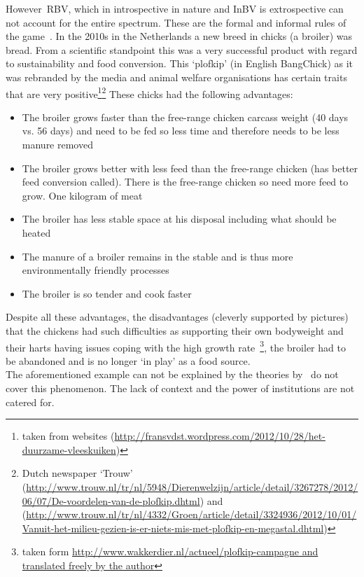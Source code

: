 However~\gls{RBV}, which in introspective in nature and \gls{InBV} is extrospective can not account for the entire spectrum. These are the formal and informal rules of the game~\cite{North:1990}. In the 2010s in the Netherlands a new breed in chicks (a broiler) was bread. From a scientific standpoint this was a very successful product with regard to sustainability and food conversion. 
This `plofkip' (in English BangChick) as it was rebranded by the media and animal welfare organisations has certain traits that are very positive\footnote{taken from websites (\url{http://fransvdst.wordpress.com/2012/10/28/het-duurzame-vleeskuiken})}\footnote{Dutch newspaper `Trouw'
(\url{http://www.trouw.nl/tr/nl/5948/Dierenwelzijn/article/detail/3267278/2012/06/07/De-voordelen-van-de-plofkip.dhtml}) 
and (\url{http://www.trouw.nl/tr/nl/4332/Groen/article/detail/3324936/2012/10/01/Vanuit-het-milieu-gezien-is-er-niets-mis-met-plofkip-en-megastal.dhtml})}
\newpage
These chicks had the following advantages:


\begin{itemize}
\item The broiler grows faster than the free-range chicken carcass weight (40 days vs. 56 days) and need to be fed so less time and therefore needs to be less manure removed
 \item    The broiler grows better with less feed than the free-range chicken (has better feed conversion called). There is the free-range chicken so need more feed to grow. One kilogram of meat
\item     The broiler has less stable space at his disposal including what should be heated
\item     The manure of a broiler remains in the stable and is thus more environmentally friendly processes
  \item   The broiler is so tender and cook faster
\end{itemize}
Despite all these advantages, the disadvantages (cleverly supported by pictures) that the chickens had such difficulties as supporting their own bodyweight and their harts having issues coping with the high growth rate~\footnote{taken form \url{http://www.wakkerdier.nl/actueel/plofkip-campagne and translated freely by the author}}, the broiler had to be abandoned and is no longer `in play' as a food source.\\
The aforementioned example can not be explained by the theories by~\cite{Porter:1980,Barney:1991} do not cover this phenomenon. The lack of context and the power of institutions are not catered for.  

